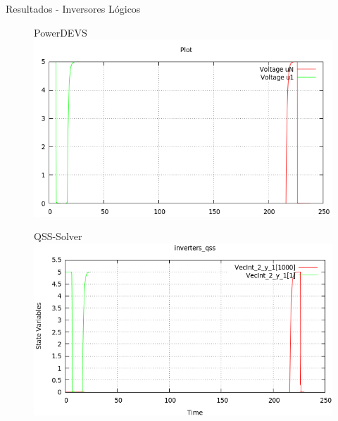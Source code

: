 \documentclass{beamer}
\begin{document}
\begin{frame}{Resultados - Inversores Lógicos}
\begin{figure}[H]
\begin{minipage}{0.5\textwidth}
\centering
PowerDEVS \\
 \includegraphics[width=\linewidth]{inversers-pd}
\end{minipage}\hfill \begin{minipage}{0.5\textwidth}
\centering
QSS-Solver \\
 \includegraphics[width=\linewidth]{inversers-qss}
\end{minipage}
\end{figure}
\end{frame}
\end{document}
